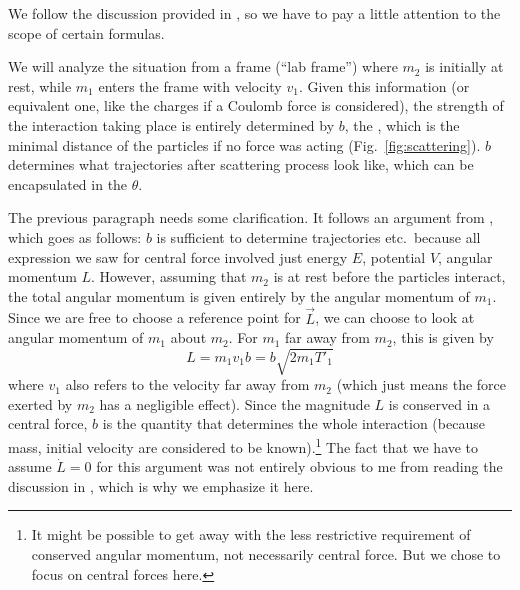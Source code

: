 \documentclass[../class_mech_main.tex]{subfiles}
\begin{document}


We follow the discussion provided in \cite{Thornton_2003}, so we have to pay a little attention to the scope of certain formulas. 


We will analyze the situation from a frame (\enquote{lab frame}) where $m_2$ is initially at rest, while $m_1$ enters the frame with velocity $v_1$. Given this information (or equivalent one, like the charges if a Coulomb force is considered), the strength of the interaction taking place is entirely determined by $b$, the , which is the minimal distance of the particles if no force was acting (Fig.~\ref{fig:scattering}). $b$ determines what trajectories after scattering process look like, which can be encapsulated in the  $\theta$.


The previous paragraph needs some clarification. It follows an argument from \cite{Thornton_2003}, which goes as follows: $b$ is sufficient to determine trajectories etc.~because all expression we saw for central force involved just energy $E$, potential $V$, angular momentum $L$. However, assuming that $m_2$ is at rest before the particles interact, the total angular momentum is given entirely by the angular momentum of $m_1$. Since we are free to choose a reference point for $\vec{L}$, we can choose to look at angular momentum of $m_1$ about $m_2$. For $m_1$ far away from $m_2$, this is given by
\begin{equation}
	L = m_1 v_1 b = b \sqrt{2 m_1 T'_1}
\end{equation}
where $v_1$ also refers to the velocity far away from $m_2$ (which just means the force exerted by $m_2$ has a negligible effect). Since the magnitude $L$ is conserved in a central force, $b$ is the quantity that determines the whole interaction (because mass, initial velocity are considered to be known).\footnote{It might be possible to get away with the less restrictive requirement of conserved angular momentum, not necessarily central force. But we chose to focus on central forces here.} The fact that we have to assume $\dot{L} = 0$ for this argument was not entirely obvious to me from reading the discussion in \cite{Thornton_2003}, which is why we emphasize it here.
\end{document}
